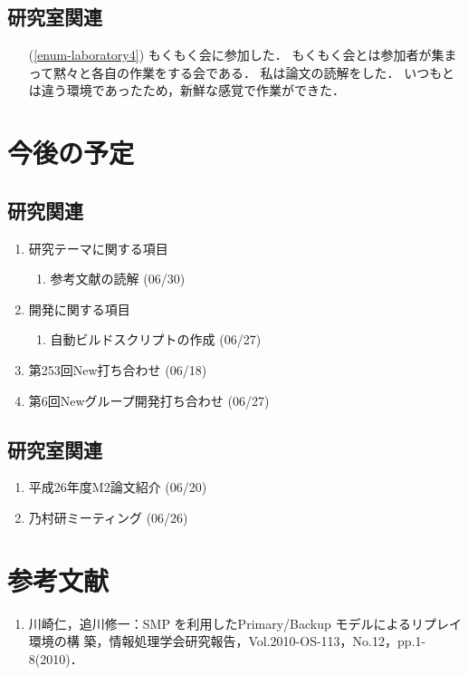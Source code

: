 \documentclass[fleqn, 14pt]{extarticle}
\begin{document}
\subsection{研究室関連}
\label{sec-3-2}
\begin{itemize}
\item[(\ref{enum-laboratory4})]
もくもく会に参加した．
もくもく会とは参加者が集まって黙々と各自の作業をする会である．
私は論文の読解をした．
いつもとは違う環境であったため，新鮮な感覚で作業ができた．

\end{itemize}






\section{今後の予定}
\label{sec-4}
\subsection{研究関連}
\label{sec-4-1}

\begin{enumerate}
\item 研究テーマに関する項目
\hfill
\begin{enumerate}


\item 参考文献の読解
\hfill
(06/30)

\end{enumerate}
\item 開発に関する項目
\hfill
\begin{enumerate}

\item 自動ビルドスクリプトの作成
\hfill
(06/27)

\end{enumerate}
\item 第253回New打ち合わせ
\hfill
\label{enum-3}
(06/18)
\item 第6回Newグループ開発打ち合わせ
\hfill
\label{enum-7}
(06/27)
\end{enumerate}

\subsection{研究室関連}
\label{sec-4-2}

\begin{enumerate}

\item 平成26年度M2論文紹介
\hfill
\label{enum-5}
(06/20)
\item 乃村研ミーティング
\hfill
\label{enum-6}
(06/26)

\end{enumerate}




\section{参考文献}
\renewcommand{\labelenumi}{[\arabic{enumi}]}
\begin{enumerate}
\item 川崎仁，追川修一：SMP を利用したPrimary/Backup モデルによるリプレイ環境の構
築，情報処理学会研究報告，Vol.2010-OS-113，No.12，pp.1-8(2010)．
\end{enumerate}
\end{document}
